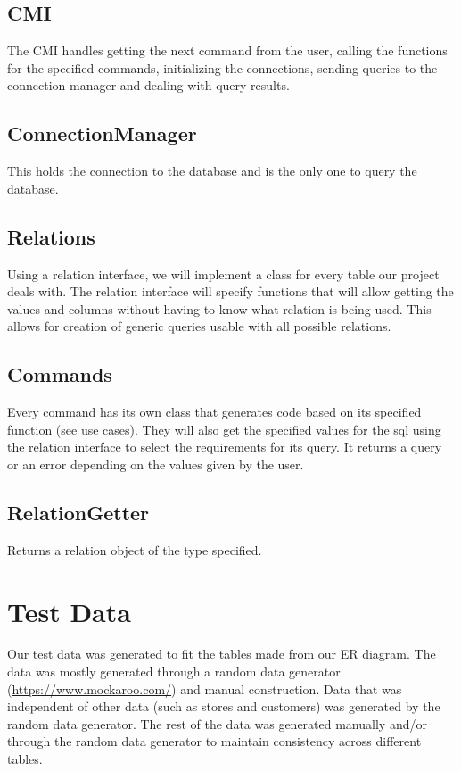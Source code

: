 \documentclass{article}
\begin{document}
		\subsection{CMI}
			The CMI handles getting the next command from the user, calling the functions for the specified commands,
			initializing the connections, sending queries to the connection manager and dealing with query results. 
			
		\subsection{ConnectionManager}
			This holds the connection to the database and is the only one to query the database. 
			
		\subsection{Relations}
			Using a relation interface, we will implement a class for every table our project deals with. The relation
			interface will specify functions that will allow getting the values and columns without having to know what
			relation is being used. This allows for creation of generic queries usable with all possible relations.
			
		\subsection{Commands}
			Every command has its own class that generates code based on its specified function (see use cases). 
			They will also get the specified values for the sql using the relation interface to select the requirements
			for its query. It returns a query or an error depending on the values given by the user.
			
		\subsection{RelationGetter}
			Returns a relation object of the type specified. 


	\section{Test Data}
		Our test data was generated to fit the tables made from our ER diagram. The
		data was mostly generated through a random data generator
		(\url{https://www.mockaroo.com/}) and manual construction. Data that was
		independent of other data (such as stores and customers) was generated by
		the random data generator. The rest of the data was generated manually
		and/or through the random data generator to maintain consistency across
		different tables.
\end{document}
